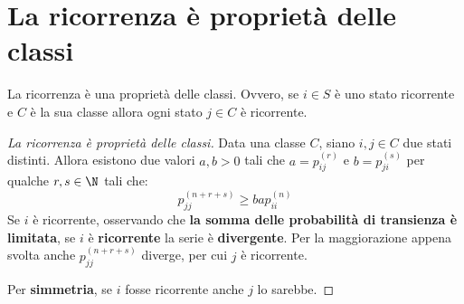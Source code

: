 \documentclass[\main/main.tex]{subfiles}
\begin{document}
\section{La ricorrenza è proprietà delle classi}
\begin{theorem}
  La ricorrenza è una proprietà delle classi. Ovvero, se \(i \in S\) è uno stato ricorrente e \(C\) è la sua classe allora ogni stato \(j \in C\) è ricorrente.
\end{theorem}
\begin{proof}[La ricorrenza è proprietà delle classi]
  Data una classe \(C\), siano \(i,j \in C\) due stati distinti. Allora esistono due valori \(a, b > 0\) tali che \(a = p^{(r)}_{ij}\) e \(b = p^{(s)}_{ji}\) per qualche \(r, s \in \N \) tali che:
  \[
    p^{(n+r+s)}_{jj} \geq bap^{(n)}_{ii}
  \]
  Se \(i\) è ricorrente, osservando che \textbf{la somma delle probabilità di transienza è limitata}, se \(i\) è \textbf{ricorrente} la serie è \textbf{divergente}. Per la maggiorazione appena svolta anche \(p^{(n+r+s)}_{jj}\) diverge, per cui \(j\) è ricorrente.

  Per \textbf{simmetria}, se \(i\) fosse ricorrente anche \(j\) lo sarebbe.
\end{proof}
\end{document}
